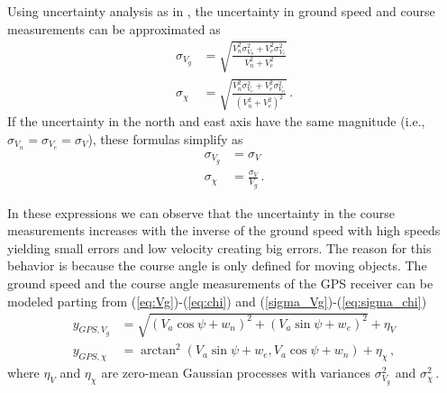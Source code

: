 Using uncertainty analysis as in \cite{Figliola2006}, the uncertainty in ground speed and course measurements can be approximated as
\begin{align*}
\sigma_{V_g}&=\sqrt{\frac{V_n^2\sigma_{V_n}^2+V_e^2\sigma_{V_e}^2}{V_n^2+V_e^2}} \\
\sigma_\chi&=\sqrt{\frac{V_n^2\sigma_{V_e}^2+V_e^2\sigma_{V_n}^2}{(V_n^2+V_e^2)^2}}\,.
\end{align*}
If the uncertainty in the north and east axis have the same magnitude (i.e., $\sigma_{V_n}=\sigma_{V_e}=\sigma_V$), these formulas simplify as
\begin{align}
\sigma_{V_g}&=\sigma_V \label{sigma_Vg}\\
\sigma_\chi&=\frac{\sigma_V}{V_g}\,. \label{eq:sigma_chi}
\end{align}

In these expressions we can observe that the uncertainty in the course measurements increases with the inverse of the ground speed with high speeds yielding small errors and low velocity creating big errors. The reason for this behavior is because the course angle is only defined for moving objects. The ground speed and the course angle measurements of the GPS receiver can be modeled parting from (\ref{eq:Vg})-(\ref{eq:chi}) and (\ref{sigma_Vg})-(\ref{eq:sigma_chi})
\begin{align}
y_{GPS,V_g}&=\sqrt{(V_a\cos\psi+w_n)^2+(V_a\sin\psi+w_e)^2}+\eta_V \\
y_{GPS,\chi}&=\arctan^2(V_a\sin\psi+w_e,V_a\cos\psi+w_n)+\eta_\chi\,,
\end{align}
where $\eta_V$ and $\eta_\chi$ are zero-mean Gaussian processes with variances $\sigma_{V_g}^2$ and $\sigma_\chi^2\,$.

